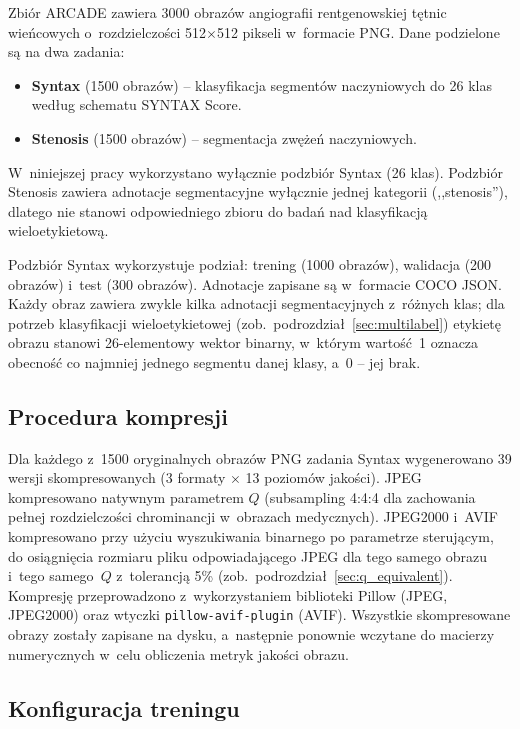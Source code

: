 \documentclass[12pt,a4paper]{article}
\begin{document}
Zbiór ARCADE zawiera 3000 obrazów angiografii rentgenowskiej tętnic wieńcowych o~rozdzielczości 512$\times$512 pikseli w~formacie PNG. Dane podzielone są na dwa zadania:

\begin{itemize}
    \item \textbf{Syntax} (1500 obrazów) -- klasyfikacja segmentów naczyniowych do 26 klas według schematu SYNTAX Score.
    \item \textbf{Stenosis} (1500 obrazów) -- segmentacja zwężeń naczyniowych.
\end{itemize}

W~niniejszej pracy wykorzystano wyłącznie podzbiór Syntax (26 klas). Podzbiór Stenosis zawiera adnotacje segmentacyjne wyłącznie jednej kategorii (,,stenosis''), dlatego nie stanowi odpowiedniego zbioru do badań nad klasyfikacją wieloetykietową.

Podzbiór Syntax wykorzystuje podział: trening (1000 obrazów), walidacja (200 obrazów) i~test (300 obrazów). Adnotacje zapisane są w~formacie COCO JSON. Każdy obraz zawiera zwykle kilka adnotacji segmentacyjnych z~różnych klas; dla potrzeb klasyfikacji wieloetykietowej (zob.~podrozdział~\ref{sec:multilabel}) etykietę obrazu stanowi 26-elementowy wektor binarny, w~którym wartość~1 oznacza obecność co najmniej jednego segmentu danej klasy, a~0 -- jej brak.

\subsection{Procedura kompresji}

Dla każdego z~1500 oryginalnych obrazów PNG zadania Syntax wygenerowano 39 wersji skompresowanych (3 formaty $\times$ 13 poziomów jakości). JPEG kompresowano natywnym parametrem $Q$ (subsampling 4:4:4 dla zachowania pełnej rozdzielczości chrominancji w~obrazach medycznych). JPEG2000 i~AVIF kompresowano przy użyciu wyszukiwania binarnego po parametrze sterującym, do osiągnięcia rozmiaru pliku odpowiadającego JPEG dla tego samego obrazu i~tego samego~$Q$ z~tolerancją 5\% (zob.~podrozdział~\ref{sec:q_equivalent}). Kompresję przeprowadzono z~wykorzystaniem biblioteki Pillow (JPEG, JPEG2000) oraz wtyczki \texttt{pillow-avif-plugin} (AVIF). Wszystkie skompresowane obrazy zostały zapisane na dysku, a~następnie ponownie wczytane do macierzy numerycznych w~celu obliczenia metryk jakości obrazu.

\subsection{Konfiguracja treningu}
\end{document}
